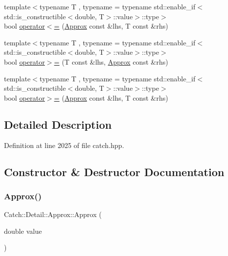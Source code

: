 \begin{DoxyCompactItemize}
\item 
{\footnotesize template$<$typename T , typename  = typename std\+::enable\+\_\+if$<$std\+::is\+\_\+constructible$<$double, T$>$\+::value$>$\+::type$>$ }\\bool \mbox{\hyperlink{class_catch_1_1_detail_1_1_approx_a6040b908588745570847d7ae8483b091}{operator$<$=}} (\mbox{\hyperlink{class_catch_1_1_detail_1_1_approx}{Approx}} const \&lhs, T const \&rhs)
\item 
{\footnotesize template$<$typename T , typename  = typename std\+::enable\+\_\+if$<$std\+::is\+\_\+constructible$<$double, T$>$\+::value$>$\+::type$>$ }\\bool \mbox{\hyperlink{class_catch_1_1_detail_1_1_approx_affd27efc62be386daeecb7a09e828d44}{operator$>$=}} (T const \&lhs, \mbox{\hyperlink{class_catch_1_1_detail_1_1_approx}{Approx}} const \&rhs)
\item 
{\footnotesize template$<$typename T , typename  = typename std\+::enable\+\_\+if$<$std\+::is\+\_\+constructible$<$double, T$>$\+::value$>$\+::type$>$ }\\bool \mbox{\hyperlink{class_catch_1_1_detail_1_1_approx_a5899b8a36725406701e2ebded2971ee6}{operator$>$=}} (\mbox{\hyperlink{class_catch_1_1_detail_1_1_approx}{Approx}} const \&lhs, T const \&rhs)
\end{DoxyCompactItemize}


\subsection{Detailed Description}


Definition at line 2025 of file catch.\+hpp.



\subsection{Constructor \& Destructor Documentation}
\mbox{\label{class_catch_1_1_detail_1_1_approx_a1a8618ea8db08c66bd3d9fe8f74b957a}} 
\subsubsection{\texorpdfstring{Approx()}{Approx()}\hspace{0.1cm}{\footnotesize\ttfamily [1/2]}}
{\footnotesize\ttfamily Catch\+::\+Detail\+::\+Approx\+::\+Approx (\begin{DoxyParamCaption}\item[{double}]{value }\end{DoxyParamCaption})\hspace{0.3cm}{\ttfamily [explicit]}}

